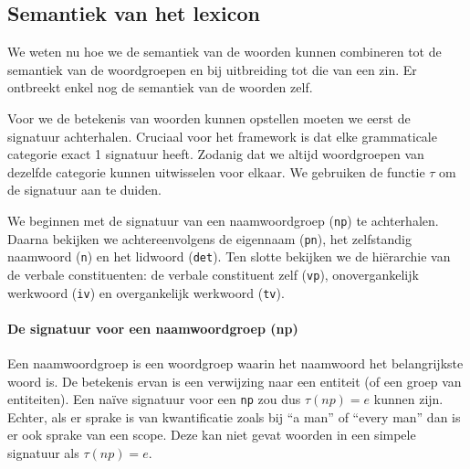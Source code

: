
\subsection{Semantiek van het lexicon} We weten nu hoe we de semantiek van de woorden kunnen combineren tot de semantiek van de woordgroepen en bij uitbreiding tot die van een zin. Er ontbreekt enkel nog de semantiek van de woorden zelf.

Voor we de betekenis van woorden kunnen opstellen moeten we eerst de signatuur achterhalen. Cruciaal voor het framework is dat elke grammaticale categorie exact 1 signatuur heeft. Zodanig dat we altijd woordgroepen van dezelfde categorie kunnen uitwisselen voor elkaar. We gebruiken de functie $\tau$ om de signatuur aan te duiden.

We beginnen met de signatuur van een naamwoordgroep (\texttt{np}) te achterhalen. Daarna bekijken we achtereenvolgens de eigennaam (\texttt{pn}), het zelfstandig naamwoord (\texttt{n}) en het lidwoord (\texttt{det}). Ten slotte bekijken we de hiërarchie van de verbale constituenten: de verbale constituent zelf (\texttt{vp}), onovergankelijk werkwoord (\texttt{iv}) en overgankelijk werkwoord (\texttt{tv}).

\paragraph{De signatuur voor een naamwoordgroep (np)} Een naamwoordgroep is een woordgroep waarin het naamwoord het belangrijkste woord is. De betekenis ervan is een verwijzing naar een entiteit (of een groep van entiteiten). Een naïve signatuur voor een \texttt{np} zou dus $\tau(np) = e$ kunnen zijn. Echter, als er sprake is van kwantificatie zoals bij ``a man'' of ``every man'' dan is er ook sprake van een scope. Deze kan niet gevat woorden in een simpele signatuur als $\tau(np) = e$.

